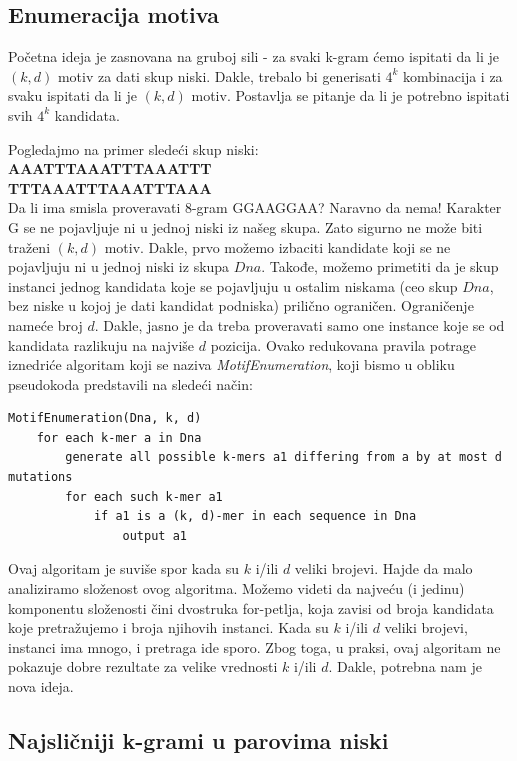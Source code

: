 \subsection{Enumeracija motiva}
Početna ideja je zasnovana na gruboj sili - za svaki k-gram ćemo ispitati da li je $(k, d)$ motiv za dati skup niski. Dakle, trebalo bi generisati $4^k$ kombinacija i za svaku ispitati da li je $(k, d)$ motiv. Postavlja se pitanje da li je potrebno ispitati svih $4^k$ kandidata. 

\noindent Pogledajmo na primer sledeći skup niski:\\
\textbf{AAATTTAAATTTAAATTT\\ TTTAAATTTAAATTTAAA\\}
Da li ima smisla proveravati 8-gram GGAAGGAA?
Naravno da nema! Karakter G se ne pojavljuje ni u jednoj niski iz našeg skupa.
Zato sigurno ne može biti traženi $(k,d)$ motiv.
Dakle, prvo možemo izbaciti kandidate koji se ne pojavljuju ni u jednoj niski iz skupa $Dna$.
Takođe, možemo primetiti da je skup instanci jednog kandidata koje se pojavljuju u ostalim niskama (ceo skup $Dna$, bez niske u kojoj je dati kandidat podniska) prilično ograničen. Ograničenje nameće broj $d$. Dakle, jasno je da treba proveravati samo one instance koje se od kandidata razlikuju na najviše $d$ pozicija. 
Ovako redukovana pravila potrage iznedriće algoritam koji se naziva \textit{MotifEnumeration}, koji bismo u obliku pseudokoda predstavili na sledeći način:

\begin{lstlisting}
MotifEnumeration(Dna, k, d)
	for each k-mer a in Dna
    	generate all possible k-mers a1 differing from a by at most d mutations
    	for each such k-mer a1
    	    if a1 is a (k, d)-mer in each sequence in Dna
    	        output a1
\end{lstlisting}

\noindent Ovaj algoritam je suviše spor kada su $k$ i/ili $d$ veliki brojevi. Hajde da malo analiziramo složenost ovog algoritma. Možemo videti da najveću (i jedinu) komponentu složenosti čini dvostruka for-petlja, koja zavisi od broja kandidata koje pretražujemo i broja njihovih instanci. Kada su $k$ i/ili $d$ veliki brojevi, instanci ima mnogo, i pretraga ide sporo. Zbog toga, u praksi, ovaj algoritam ne pokazuje dobre rezultate za velike vrednosti $k$ i/ili $d$.
Dakle, potrebna nam je nova ideja.

\subsection{Najsličniji k-grami u parovima niski}

